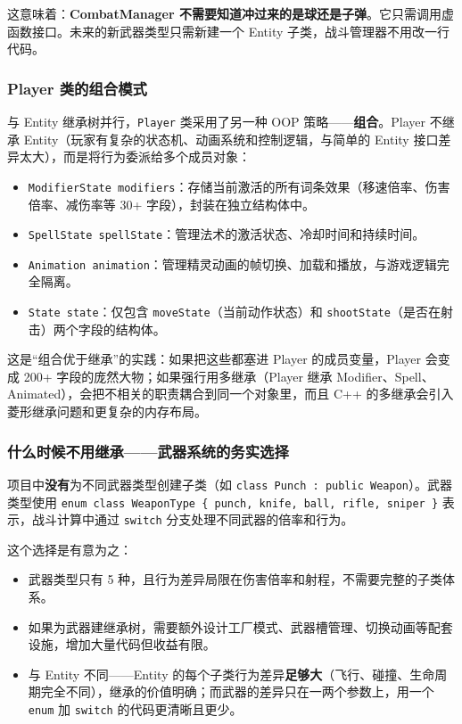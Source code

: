 \documentclass[utf8]{ctexart}
\begin{document}
这意味着：\textbf{CombatManager 不需要知道冲过来的是球还是子弹}。它只需调用虚函数接口。未来的新武器类型只需新建一个 Entity 子类，战斗管理器不用改一行代码。

\subsubsection{Player 类的组合模式}

与 Entity 继承树并行，\texttt{Player} 类采用了另一种 OOP 策略——\textbf{组合}。Player 不继承 Entity（玩家有复杂的状态机、动画系统和控制逻辑，与简单的 Entity 接口差异太大），而是将行为委派给多个成员对象：

\begin{itemize}
  \item \texttt{ModifierState modifiers}：存储当前激活的所有词条效果（移速倍率、伤害倍率、减伤率等 30+ 字段），封装在独立结构体中。
  \item \texttt{SpellState spellState}：管理法术的激活状态、冷却时间和持续时间。
  \item \texttt{Animation animation}：管理精灵动画的帧切换、加载和播放，与游戏逻辑完全隔离。
  \item \texttt{State state}：仅包含 \texttt{moveState}（当前动作状态）和 \texttt{shootState}（是否在射击）两个字段的结构体。
\end{itemize}

这是“组合优于继承”的实践：如果把这些都塞进 Player 的成员变量，Player 会变成 200+ 字段的庞然大物；如果强行用多继承（Player 继承 Modifier、Spell、Animated），会把不相关的职责耦合到同一个对象里，而且 C++ 的多继承会引入菱形继承问题和更复杂的内存布局。

\subsubsection{什么时候不用继承——武器系统的务实选择}

项目中\textbf{没有}为不同武器类型创建子类（如 \texttt{class Punch : public Weapon}）。武器类型使用 \texttt{enum class WeaponType \{ punch, knife, ball, rifle, sniper \}} 表示，战斗计算中通过 \texttt{switch} 分支处理不同武器的倍率和行为。

这个选择是有意为之：
\begin{itemize}
  \item 武器类型只有 5 种，且行为差异局限在伤害倍率和射程，不需要完整的子类体系。
  \item 如果为武器建继承树，需要额外设计工厂模式、武器槽管理、切换动画等配套设施，增加大量代码但收益有限。
  \item 与 Entity 不同——Entity 的每个子类行为差异\textbf{足够大}（飞行、碰撞、生命周期完全不同），继承的价值明确；而武器的差异只在一两个参数上，用一个 \texttt{enum} 加 \texttt{switch} 的代码更清晰且更少。
\end{itemize}
\end{document}
